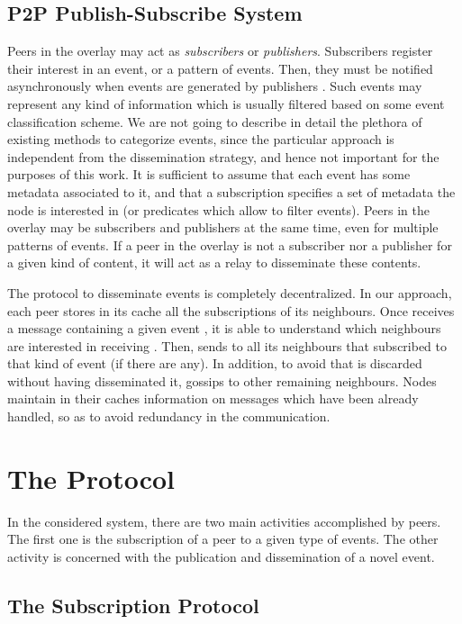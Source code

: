 \documentclass[10pt, conference, compsocconf]{IEEEtran}
\begin{document}
\subsection{P2P Publish-Subscribe System}

Peers in the overlay may act as \emph{subscribers} or \emph{publishers}. Subscribers register their interest in an event, or a pattern of events. Then, they must be notified asynchronously when events are generated by publishers \cite{Eugster:2003}. Such events may represent any kind of information which is usually filtered based on some event classification scheme. We are not going to describe in detail the plethora of existing methods to categorize events, since the particular approach is independent from the dissemination strategy, and hence not important for the purposes of this work. 
It is sufficient to assume that each event has some metadata associated to it, and that a subscription specifies a set of metadata the node is interested in (or predicates which allow to filter events).
Peers in the overlay may be subscribers and publishers at the same time, even for multiple patterns of events. If a peer in the overlay is not a subscriber nor a publisher for a given kind of content, it will act as a relay to disseminate these contents.

The protocol to disseminate events is completely decentralized. 
In our approach, each peer  stores in its cache all the subscriptions of its neighbours. Once  receives a message containing a given event , it is able to understand which neighbours are interested in receiving . Then,  sends  to all its neighbours that subscribed to that kind of event (if there are any). In addition, to avoid that  is discarded without having disseminated it,  gossips  to other remaining neighbours.
Nodes maintain in their caches information on messages which have been already handled, so as to avoid redundancy in the communication. 


\section{The Protocol}\label{sec:protocol}

In the considered system, there are two main activities accomplished by peers. The first one is the subscription of a peer to a given type of events. The other activity is concerned with the publication and dissemination of a novel event. 

\subsection{The Subscription Protocol}
\end{document}
